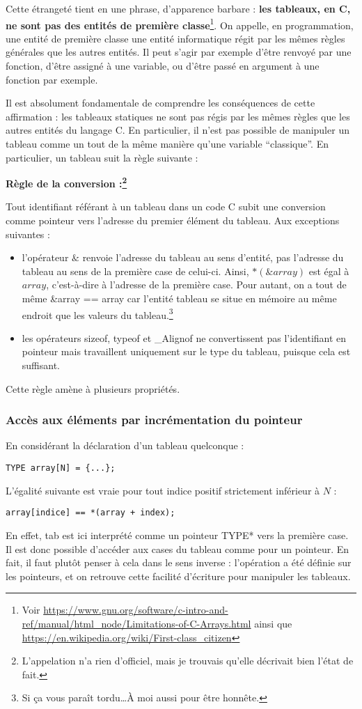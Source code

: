 \documentclass[../../../main.tex]{subfiles}
\begin{document}
Cette étrangeté tient en une phrase, d'apparence barbare : \textbf{les tableaux, en C, ne sont pas des entités de première classe}\footnote{Voir \url{https://www.gnu.org/software/c-intro-and-ref/manual/html_node/Limitations-of-C-Arrays.html} ainsi que \url{https://en.wikipedia.org/wiki/First-class_citizen}}. On appelle, en programmation, une entité de première classe une entité informatique régit par les mêmes règles générales que les autres entités. Il peut s'agir par exemple d'être renvoyé par une fonction, d'être assigné à une variable, ou d'être passé en argument à une fonction par exemple.
 
Il est absolument fondamentale de comprendre les conséquences de cette affirmation : les tableaux statiques ne sont pas régis par les mêmes règles que les autres entités du langage C. En particulier, il n'est pas possible de manipuler un tableau comme un tout de la même manière qu'une variable ``classique''. En particulier, un tableau suit la règle suivante :
 
\textbf{Règle de la conversion :\footnote{L'appelation n'a rien d'officiel, mais je trouvais qu'elle décrivait bien l'état de fait.}}
 
Tout identifiant référant à un tableau dans un code C subit une conversion comme pointeur vers l'adresse du premier élément du tableau. Aux exceptions suivantes :
\begin{itemize}
	\item l'opérateur $\&$ renvoie l'adresse du tableau au sens d'entité, pas l'adresse du tableau au sens de la première case de celui-ci. Ainsi, $*(\&array)$ est égal à $array$, c'est-à-dire à l'adresse de la première case. Pour autant, on a tout de même \textsf{\&array == array} car l'entité tableau se situe en mémoire au même endroit que les valeurs du tableau.\footnote{Si ça vous paraît tordu\dots À moi aussi pour être honnête.}
	\item les opérateurs \textsf{sizeof}, \textsf{typeof} et \textsf{\_Alignof} ne convertissent pas l'identifiant en pointeur mais travaillent uniquement sur le type du tableau, puisque cela est suffisant.
\end{itemize}
Cette règle amène à plusieurs propriétés.
\subsubsection{Accès aux éléments par incrémentation du pointeur}
En considérant la déclaration d'un tableau quelconque :
\begin{verbatim}
TYPE array[N] = {...};
\end{verbatim}
L'égalité suivante est vraie pour tout indice positif strictement inférieur à $N$ :
\begin{verbatim}
array[indice] == *(array + index);
\end{verbatim}
En effet, \textsf{tab} est ici interprété comme un pointeur \textsf{TYPE*} vers la première case. Il est donc possible d'accéder aux cases du tableau comme pour un pointeur. En fait, il faut plutôt penser à cela dans le sens inverse : l'opération a été définie sur les pointeurs, et on retrouve cette facilité d'écriture pour manipuler les tableaux.
 
\end{document}
